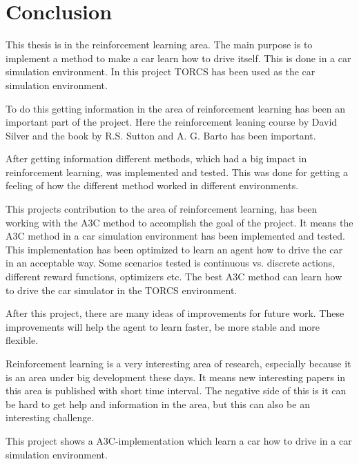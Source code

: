 \chapter{Conclusion}\label{Conclusion}
This thesis is in the reinforcement learning area. The main purpose is to implement a method to make a car learn how to drive itself. This is done in a car simulation environment. In this project TORCS has been used as the car simulation environment.  

To do this getting information in the area of reinforcement learning has been an important part of the project. Here the reinforcement leaning course by David Silver \cite{RL_course} and the book by R.S. Sutton and A. G. Barto \cite{Sutton} has been important. 

After getting information different methods, which had a big impact in reinforcement learning, was implemented and tested. This was done for getting a feeling of how the different method worked in different environments.  

This projects contribution to the area of reinforcement learning, has been working with the A3C method to accomplish the goal of the project. It means the A3C method in a car simulation environment has been implemented and tested. This implementation has been optimized to learn an agent how to drive the car in an acceptable way. Some scenarios tested is continuous vs. discrete actions, different reward functions, optimizers etc. The best A3C method can learn how to drive the car simulator in the TORCS environment.    

After this project, there are many ideas of improvements for future work. These improvements will help the agent to learn faster, be more stable and more flexible. 

Reinforcement learning is a very interesting area of research, especially because it is an area under big development these days. It means new interesting papers in this area is published with short time interval. The negative side of this is it can be hard to get help and information in the area, but this can also be an interesting challenge.

This project shows a A3C-implementation which learn a car how to drive in a car simulation environment.     